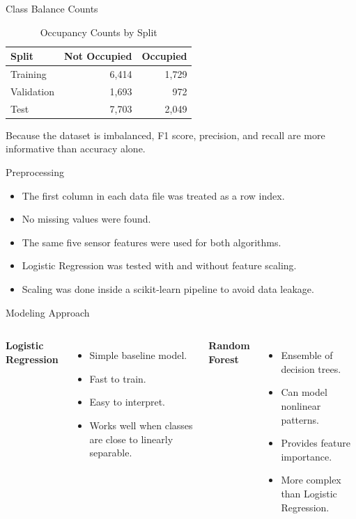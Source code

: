 \documentclass[aspectratio=169,11pt]{beamer}
\begin{document}
\begin{frame}{Class Balance Counts}
    \begin{table}
        \centering
        \caption{Occupancy Counts by Split}
        \begin{tabular}{lrr}
            \toprule
            Split & Not Occupied & Occupied \\
            \midrule
            Training & 6,414 & 1,729 \\
            Validation & 1,693 & 972 \\
            Test & 7,703 & 2,049 \\
            \bottomrule
        \end{tabular}
    \end{table}

    \vspace{0.3cm}
    Because the dataset is imbalanced, F1 score, precision, and recall are more informative than accuracy alone.
\end{frame}

\begin{frame}{Preprocessing}
    \begin{itemize}
        \item The first column in each data file was treated as a row index.
        \item No missing values were found.
        \item The same five sensor features were used for both algorithms.
        \item Logistic Regression was tested with and without feature scaling.
        \item Scaling was done inside a scikit-learn pipeline to avoid data leakage.
    \end{itemize}
\end{frame}

\begin{frame}{Modeling Approach}
    \begin{columns}
        \textbf{Logistic Regression}
        \begin{itemize}
            \item Simple baseline model.
            \item Fast to train.
            \item Easy to interpret.
            \item Works well when classes are close to linearly separable.
        \end{itemize}

        \textbf{Random Forest}
        \begin{itemize}
            \item Ensemble of decision trees.
            \item Can model nonlinear patterns.
            \item Provides feature importance.
            \item More complex than Logistic Regression.
        \end{itemize}
    \end{columns}
\end{frame}
\end{document}
